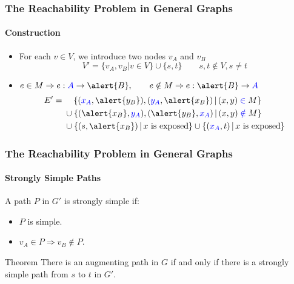 \documentclass[pdftex]{beamer}
\newcommand{\blue}[1]{\textcolor{blue}{#1}}
\begin{document}
\begin{frame} \frametitle{The Reachability Problem in General Graphs}
  \framesubtitle{Construction}
  \vspace{-1ex}
  \begin{itemize}
  \item For each $v \in V$, we introduce two nodes $v_A$ and $v_B$
    \[
    V' = \{ v_A, v_B | v \in V\} \cup \{s, t\} \qquad s, t \notin V,
    s \ne t
    \]
  \item $e \in M \Rightarrow e: \blue{A} \rightarrow \alert{B}, \qquad e \notin M
    \Rightarrow e: \alert{B} \rightarrow \blue{A}$
    \[
    \begin{split}
      E' = {} & \hspace{2.5ex} \{ (\blue{x_A}, \alert{y_B}), (\blue{y_A}, \alert{x_B}) \, | \, (x,y) \blue{{}\in{}} M \}\\
              & \cup \{ (\alert{x_B}, \blue{y_A}), (\alert{y_B}, \blue{x_A}) \, | \, (x,y) \blue{{}\notin{}} M \}\\
              & {} \cup \{ (s, \alert{x_B}) \, | \, x \text{ is exposed} \}
              \cup \{ (\blue{x_A}, t) \, | \, x \text{ is exposed} \}
    \end{split}
     \]
  \end{itemize}
  \vspace{-3ex}
  \begin{center}
    
  \end{center}
\end{frame}

\begin{frame} \frametitle{The Reachability Problem in General Graphs}
  \framesubtitle{Strongly Simple Paths}
  A path $P$ in $G'$ is strongly simple if:
  \begin{itemize}
  \item $P$ is simple.
  \item $v_A \in P \Rightarrow v_B \notin P$.
  \end{itemize}
  \begin{block}{Theorem}
    There is an augmenting path in $G$ if and only if there is a
    strongly simple path from $s$ to $t$ in $G'$.
  \end{block}
  \vspace{-2ex}
  \begin{center}
    
  \end{center}
\end{frame}
\end{document}
